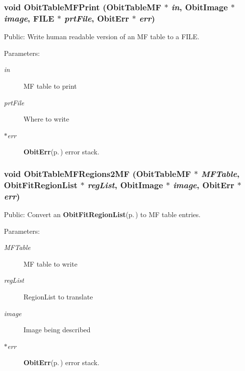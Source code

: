 \subsubsection{\setlength{\rightskip}{0pt plus 5cm}void Obit\-Table\-MFPrint ({\bf Obit\-Table\-MF} $\ast$ {\em in}, {\bf Obit\-Image} $\ast$ {\em image}, FILE $\ast$ {\em prt\-File}, {\bf Obit\-Err} $\ast$ {\em err})}\label{ObitTableMFUtil_8c_a5}


Public: Write human readable version of an MF table to a FILE. 

\begin{Desc}
\item[Parameters:]
\begin{description}
\item[{\em in}]MF table to print \item[{\em prt\-File}]Where to write \item[{\em $\ast$err}]{\bf Obit\-Err}{\rm (p.\,\pageref{structObitErr})} error stack. \end{description}
\end{Desc}
\subsubsection{\setlength{\rightskip}{0pt plus 5cm}void Obit\-Table\-MFRegions2MF ({\bf Obit\-Table\-MF} $\ast$ {\em MFTable}, {\bf Obit\-Fit\-Region\-List} $\ast$ {\em reg\-List}, {\bf Obit\-Image} $\ast$ {\em image}, {\bf Obit\-Err} $\ast$ {\em err})}\label{ObitTableMFUtil_8c_a3}


Public: Convert an {\bf Obit\-Fit\-Region\-List}{\rm (p.\,\pageref{structObitFitRegionList})} to MF table entries. 

\begin{Desc}
\item[Parameters:]
\begin{description}
\item[{\em MFTable}]MF table to write \item[{\em reg\-List}]Region\-List to translate \item[{\em image}]Image being described \item[{\em $\ast$err}]{\bf Obit\-Err}{\rm (p.\,\pageref{structObitErr})} error stack. \end{description}
\end{Desc}
